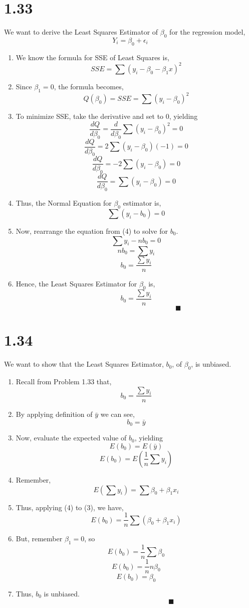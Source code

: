 \documentclass{article}
\begin{document}
\section*{1.33}
	We want to derive the Least Squares Estimator of $\beta_0$ for the regression model,
		\[Y_i = \beta_0 + \epsilon_i\]
	\begin{enumerate}[label = \arabic*)]
		\item We know the formula for SSE of Least Squares is,
			\[SSE = \sum(y_i - \beta_0 - \beta_1x)^2\]
		\item Since $\beta_1 = 0$, the formula becomes,
			\[Q(\beta_0) = SSE = \sum(y_i - \beta_0)^2\]
		\item To minimize SSE, take the derivative and set to 0, yielding
			\[\frac{dQ}{d\beta_0} = \frac{d}{d\beta_0} \sum(y_i - \beta_0)^2 = 0 \]
			\[\frac{dQ}{d\beta_0} = 2\sum(y_i - \beta_0)  (-1) = 0\]
			\[\frac{dQ}{d\beta_0} = -2\sum(y_i - \beta_0) = 0\]
			\[\frac{dQ}{d\beta_0} = \sum(y_i - \beta_0) = 0\]
		\item Thus, the Normal Equation for $\beta_0$ estimator is,
			\[ \sum(y_i - b_0)= 0\]
		\item Now, rearrange the equation from (4) to solve for $b_0$.
			\[\sum y_i - nb_0 = 0\]
			\[nb_0 = \sum y_i\]
			\[b_0 = \frac{\sum y_i}{n}\]
		\item Hence, the Least Squares Estimator for $\beta_0$ is,
			\[b_0 = \frac{\sum y_i}{n}\]
			\[\qquad \qquad \qquad \qquad \qquad \qquad \blacksquare\]
			
	\end{enumerate}

\section*{1.34}
	We want to show that the Least Squares Estimator, $b_0$, of $\beta_0$, is unbiased.
	\begin{enumerate}
		\item Recall from Problem 1.33 that,
			\[b_0 = \frac{\sum y_i}{n}\]
		\item By applying definition of $\bar{y}$ we can see, 
			\[b_0 = \bar{y}\]
		\item Now, evaluate the expected value of $b_0$, yielding
			\[E(b_0) = E(\bar{y})\]
			\[E(b_0) = E(\frac{1}{n}\sum y_i)\]
		\item Remember, 
			\[E(\sum y_i) = \sum \beta_0 + \beta_1x_i\]
		\item Thus, applying (4) to (3), we have,
			\[E(b_0) = \frac{1}{n}\sum (\beta_0 + \beta_1x_i)\]
		\item But, remember $\beta_1 = 0$, so
			\[E(b_0) = \frac{1}{n} \sum \beta_0\]
			\[E(b_0) = \frac{1}{n}n\beta_0\]
			\[E(b_0) = \beta_0\]
		\item Thus, $b_0$ is unbiased.
			\[\qquad \qquad \qquad \qquad \qquad \blacksquare\]
	\end{enumerate}
		
\end{document}
